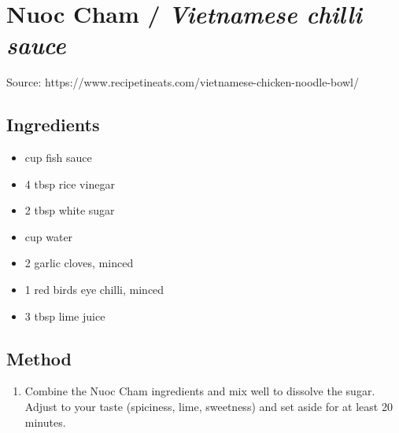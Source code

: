 \section{Nuoc Cham / \emph{Vietnamese chilli sauce}}


Source: https://www.recipetineats.com/vietnamese-chicken-noodle-bowl/

\subsection{Ingredients}

\begin{itemize}
    \item {} cup fish sauce
    \item 4 tbsp rice vinegar
    \item 2 tbsp white sugar
    \item {} cup water
    \item 2 garlic cloves, minced
    \item 1 red birds eye chilli, minced
    \item 3 tbsp lime juice
\end{itemize}

\subsection{Method}

\begin{enumerate}
    \item Combine the Nuoc Cham ingredients and mix well to dissolve the sugar. Adjust to your taste (spiciness, lime, sweetness) and set aside for at least 20 minutes.
\end{enumerate}
